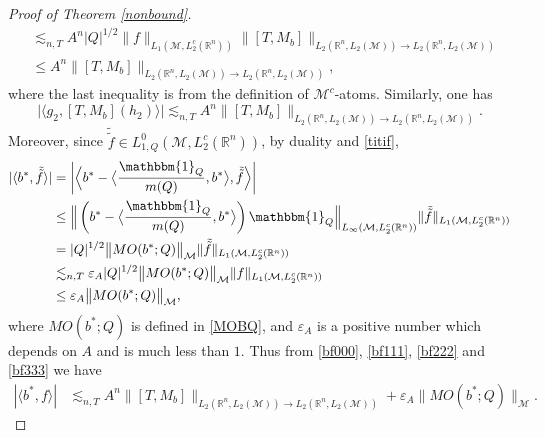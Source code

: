\documentclass[oneside,english,a4wide]{amsart}
\numberwithin{equation}{section}
\numberwithin{figure}{section}
\theoremstyle{plain}
\theoremstyle{plain}
\theoremstyle{definition}
\theoremstyle{plain}
\theoremstyle{remark}
\theoremstyle{definition}
\theoremstyle{remark}
\theoremstyle{definition}
\newcommand{\8}{\infty}
\begin{document}
\begin{proof}[Proof of Theorem \ref{nonbound}]
\begin{equation}
\begin{aligned}
			&\lesssim_{n,T} A^n|Q|^{1/2}\|f\|_{L_1(\mathcal{M},L_2^c(\mathbb{R}^n))}\|[T,M_{b}]\|_{L_2(\mathbb{R}^n,L_2(\mathcal{M}))\to L_2(\mathbb{R}^n,L_2(\mathcal{M}))}\\
			&\le A^n\|[T,M_{b}]\|_{L_2(\mathbb{R}^n,L_2(\mathcal{M}))\to L_2(\mathbb{R}^n,L_2(\mathcal{M}))},
		\end{aligned}
	\end{equation}
	where the last inequality is from the definition of $\mathcal{M}^c$-atoms. Similarly, one has
	\begin{equation}\label{bf222}
		\big|\big\langle g_2,[T,M_b](h_2)\big\rangle\big|\lesssim_{n,T} A^n\|[T,M_{b}]\|_{L_2(\mathbb{R}^n,L_2(\mathcal{M}))\to L_2(\mathbb{R}^n,L_2(\mathcal{M}))}.
	\end{equation}
     Moreover, since $\tilde{\tilde{f}}\in L^0_{1,Q}(\mathcal{M},L_2^c(\mathbb{R}^n))$, 
     by duality and \eqref{titif},
	\begin{equation}\label{bf333}
		\begin{aligned}
			|\langle b^*,\tilde{\tilde{f}}\rangle|{}&=\bigg|\Big\langle b^*-\big\langle \frac{\mathbbm{1}_Q}{m(Q)},b^*\big\rangle,\tilde{\tilde{f}}\Big\rangle\bigg|\\
			&\le \Big\|\left(b^*-\big\langle \frac{\mathbbm{1}_Q}{m(Q)},b^*\big\rangle\right)\mathbbm{1}_Q\Big\|_{L_\infty(\mathcal{M},L_2^c(\mathbb{R}^n))}\|\tilde{\tilde{f}}\|_{L_1(\mathcal{M},L_2^c(\mathbb{R}^n))}\\ &=|Q|^{1/2} \big\|MO(b^*;Q)\big\|_{\mathcal{M}}\|\tilde{\tilde{f}}\|_{L_1(\mathcal{M},L_2^c(\mathbb{R}^n))}\\
			&\lesssim_{n,T} \varepsilon_A |Q|^{1/2}\big\|MO(b^*;Q)\big\|_{\mathcal{M}}\|f\|_{L_1(\mathcal{M},L_2^c(\mathbb{R}^n))}\\
			&\le \varepsilon_A \big\|MO(b^*;Q)\big\|_{\mathcal{M}},
		\end{aligned}
	\end{equation}
     where $MO(b^*;Q)$ is defined in \eqref{MOBQ}, and $\varepsilon_A$ is a positive number which depends on $A$ and is much less than $1$.
	Thus from \eqref{bf000}, \eqref{bf111}, \eqref{bf222} and \eqref{bf333} we have
	\begin{equation*}
		\begin{aligned}
			|\langle b^*,f\rangle|{}&\lesssim_{n,T} A^n\|[T,M_{b}]\|_{L_2(\mathbb{R}^n,L_2(\mathcal{M}))\to L_2(\mathbb{R}^n,L_2(\mathcal{M}))}+\varepsilon_A \big\|MO(b^*;Q)\big\|_{\mathcal{M}}.
		\end{aligned}
	\end{equation*}

\end{proof}
\end{document}
